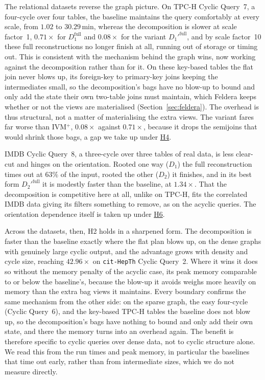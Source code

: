 The relational datasets reverse the graph picture. On TPC-H Cyclic Query~7, a four-cycle over four tables, the baseline maintains the query comfortably at every scale, from $1.02$ to $30.29$\,min, whereas the decomposition is slower at scale factor~1, $0.71\times$ for $D_1^{\text{full}}$ and $0.08\times$ for the variant $D_1'^{\text{full}}$, and by scale factor~10 these full reconstructions no longer finish at all, running out of storage or timing out. This is consistent with the mechanism behind the graph wins, now working against the decomposition rather than for it. On these key-based tables the flat join never blows up, its foreign-key to primary-key joins keeping the intermediates small, so the decomposition's bags have no blow-up to bound and only add the state their own two-table joins must maintain, which Feldera keeps whether or not the views are materialised (Section~\ref{sec:feldera}). The overhead is thus structural, not a matter of materialising the extra views. The variant fares far worse than IVM$^+$, $0.08\times$ against $0.71\times$, because it drops the semijoins that would shrink those bags, a gap we take up under \hyperlink{h4}{H4}.

IMDB Cyclic Query~8, a three-cycle over three tables of real data, is less clear-cut and hinges on the orientation. Rooted one way ($D_1$) the full reconstruction times out at $63\%$ of the input, rooted the other ($D_2$) it finishes, and in its best form $D_2'^{\text{full}}$ it is modestly faster than the baseline, at $1.34\times$. That the decomposition is competitive here at all, unlike on TPC-H, fits the correlated IMDB data giving its filters something to remove, as on the acyclic queries. The orientation dependence itself is taken up under \hyperlink{h6}{H6}.

Across the datasets, then, H2 holds in a sharpened form. The decomposition is faster than the baseline exactly where the flat plan blows up, on the dense graphs with genuinely large cyclic output, and the advantage grows with density and cycle size, reaching $42.96\times$ on \texttt{cit-HepTh} Cyclic Query~2. Where it wins it does so without the memory penalty of the acyclic case, its peak memory comparable to or below the baseline's, because the blow-up it avoids weighs more heavily on memory than the extra bag views it maintains. Every boundary confirms the same mechanism from the other side: on the sparse graph, the easy four-cycle (Cyclic Query~6), and the key-based TPC-H tables the baseline does not blow up, so the decomposition's bags have nothing to bound and only add their own state, and there the memory turns into an overhead again. The benefit is therefore specific to cyclic queries over dense data, not to cyclic structure alone. We read this from the run times and peak memory, in particular the baselines that time out early, rather than from intermediate sizes, which we do not measure directly.

